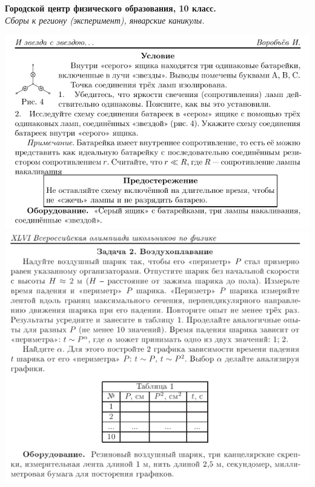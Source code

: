 




\begin{center}
  \Large{\textbf{Городской центр физического образования, 10 класс.}\\
  \textit{Сборы к региону (эксперимент), январские каникулы.}}
\end{center}

\large

\begin{center}
  \includegraphics[width=16cm]{exp1}
  \includegraphics[width=16cm]{exp2}
\end{center}

\clearpage

